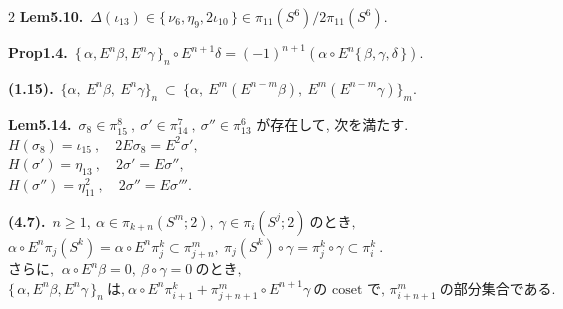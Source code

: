\documentclass[10pt, leqno]{ltjsarticle}
\newcommand{\Ex}{E}        %
\newcommand{\toda}[1]{\{\,#1\,\}}              %
\newcommand{\todai}[2][]{\{\,#2\,\}_{#1}}      %
\newcommand{\pis}[2]{\pi_{#1}(#2)}       %
\newcommand{\pit}[2]{\pi_{#1}^{#2}}
\numberwithin{equation}{section}
\theoremstyle{plain}
\theoremstyle{definition}
\theoremstyle{remark}
\begin{document}
\begin{paracol}{2}
\noindent
\textbf{Lem5.10.}\
\(
\Delta(\iota_{13})\in\toda{\nu_6,\eta_9,2\iota_{10}}\in\pi_{11}(S^6)/2\pi_{11}(S^6) .
\)

\noindent
\textbf{Prop1.4.}\
\(\todai[n]{\alpha, E^n\beta, E^n\gamma}\circ E^{n+1}\delta
= (-1)^{n+1}(\alpha\circ E^n\toda{\beta, \gamma, \delta})\).

\noindent
\textbf{(1.15).}\
\(\{\alpha,\ \Ex^n\beta,\ \Ex^n\gamma\}_n
\ \subset\
\bigl\{\alpha,\ \Ex^{m}(E^{n-m}\beta),\ E^{m}(E^{n-m}\gamma)\bigr\}_m .\)

\noindent
\textbf{Lem5.14.}\
\(\sigma_{8}\in\pi^{8}_{15}\ , \ \sigma'\in\pi^{7}_{14}\ , \ \sigma''\in\pi^{6}_{13}\) 
が存在して, 次を満たす. \\
\(H(\sigma_{8})=\iota_{15} \ ,\quad 2E\sigma_{8}=E^{2}\sigma',\)\\
\(H(\sigma')=\eta_{13} \ ,\quad 2\sigma'=E\sigma'',\)\\
\(H(\sigma'')=\eta_{11}^2 \ ,\quad 2\sigma''=E\sigma''' .\)

\noindent
\textbf{(4.7).}\
\(n\ge1, \ \alpha\in\pis{k+n}{S^m; 2},\ \gamma\in\pis{i}{S^j; 2}
\ \text{のとき, }\)\\
\(\alpha\circ E^n\pis{j}{S^k} = \alpha\circ E^n \pit{j}{k}
\subset \pit{j+n}{m},
\ \pis{j}{S^k}\circ\gamma = \pit{j}{k}\circ\gamma \subset\pit{i}{k}\ . \)\\
\(\text{さらに, }\ \alpha\circ E^n\beta=0,\ \beta\circ\gamma = 0 \ \text{のとき, }\)\\
\(\todai[n]{\alpha, E^n\beta, E^n\gamma}\ \text{は,}\
\alpha\circ E^n\pit{i+1}{k} + \pit{j+n+1}{m}\circ E^{n+1}\gamma\
\text{の coset で, }\pit{i+n+1}{m} \ \text{の部分集合である. }\)







\end{paracol}
\end{document}
